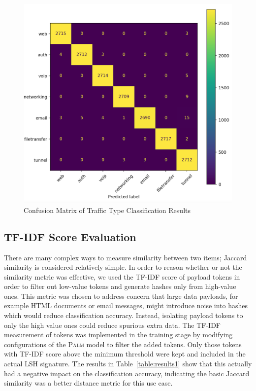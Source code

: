 \begin{figure} [hbt!]
  \centering
  \includegraphics[width=0.8\columnwidth]{chapters/4/img/traffic_class_results.png}
  \caption{Confusion Matrix of Traffic Type Classification Results}
  \label{fig:trafficresults}
\end{figure}

\subsection{TF-IDF Score Evaluation}

There are many complex ways to measure similarity between two items; Jaccard similarity is considered relatively simple. In order to reason whether or not the similarity metric was effective, we used the TF-IDF score of payload tokens in order to filter out low-value tokens and generate hashes only from high-value ones. This metric was chosen to address concern that large data payloads, for example HTML documents or email messages, might introduce noise into hashes which would reduce classification accuracy. Instead, isolating payload tokens to only the high value ones could reduce spurious extra data. The TF-IDF measurement of tokens was implemented in the training stage by modifying configurations of the \textsc{Palm} model to filter the added tokens. Only those tokens with TF-IDF score above the minimum threshold were kept and included in the actual LSH signature. The results in Table~\ref{table:results1} show that this actually had a negative impact on the classification accuracy, indicating the basic Jaccard similarity was a better distance metric for this use case.

